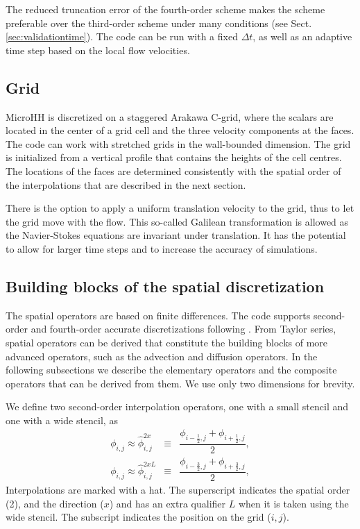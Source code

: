 \documentclass[gmd,manuscript]{copernicus}
\begin{document}
The reduced truncation error of the fourth-order scheme makes the scheme preferable over the third-order scheme under many conditions (see Sect. \ref{sec:validationtime}). The code can be run with a fixed $\Delta t$, as well as an adaptive time step based on the local flow velocities.

\subsection{Grid}
MicroHH is discretized on a staggered Arakawa C-grid, where the scalars are located in the center of a grid cell and the three velocity components at the faces. The code can work with stretched grids in the wall-bounded dimension. The grid is initialized from a vertical profile that contains the heights of the cell centres. The locations of the faces are determined consistently with the spatial order of the interpolations that are described in the next section.

There is the option to apply a uniform translation velocity to the grid, thus to let the grid move with the flow. This so-called Galilean transformation is allowed as the Navier-Stokes equations are invariant under translation. It has the potential to allow for larger time steps and to increase the accuracy of simulations.

\subsection{Building blocks of the spatial discretization}
The spatial operators are based on finite differences. The code supports second-order and fourth-order accurate discretizations following \citet{Morinishi1998, Vasilyev2000}. From Taylor series, spatial operators can be derived that constitute the building blocks of more advanced operators, such as the advection and diffusion operators. In the following subsections we describe the elementary operators and the composite operators that can be derived from them. We use only two dimensions for brevity.

We define two second-order interpolation operators, one with a small stencil and one with a wide stencil, as
\begin{eqnarray}
\phi_{i,j} \approx \widehat{\phi}^{2x }_{i,j} & \equiv & \dfrac{\phi_{i-\frac{1}{2},j} + \phi_{i+\frac{1}{2},j}}{2},\\
\phi_{i,j} \approx \widehat{\phi}^{2xL}_{i,j} & \equiv & \dfrac{\phi_{i-\frac{3}{2},j} + \phi_{i+\frac{3}{2},j}}{2},
\end{eqnarray}
Interpolations are marked with a hat. The superscript indicates the spatial order (2), and the direction ($x$) and has an extra qualifier $L$ when it is taken using the wide stencil. The subscript indicates the position on the grid ($i,j$).
\end{document}
